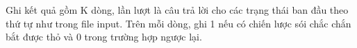 Ghi kết quả gồm K dòng, lần lượt là câu trả lời cho các trạng thái ban đầu theo thứ tự như trong file input. Trên mỗi dòng, ghi 1 nếu có chiến lược sói chắc chắn bắt được thỏ và 0 trong trường hợp ngược lại.

\